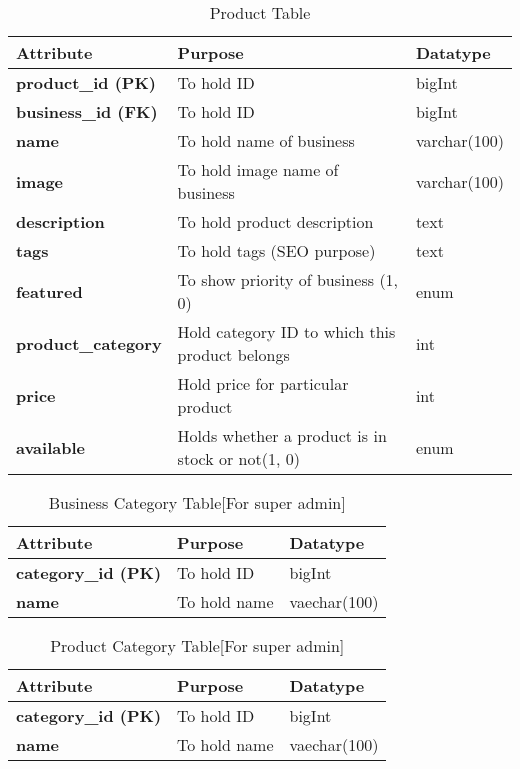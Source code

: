 \documentclass[a4paper]{report}
\begin{document}
\newpage
\begin{table}[ht]
\centering
\caption{Product Table}
\begin{tabular}{lll}    \toprule
Attribute & Purpose & Datatype  \\\midrule
\textbf{product\_id (PK)}    & To hold ID & bigInt  \\
\textbf{business\_id (FK)}    & To hold ID & bigInt  \\  
\textbf{name}    & To hold name of business & varchar(100)  \\
\textbf{image}    & To hold image name of business & varchar(100)  \\
\textbf{description}    & To hold product description & text\\ 
\textbf{tags}    & To hold tags (SEO purpose)  & text \\
\textbf{featured}    & To show priority of business (1, 0)  & enum\\
\textbf{product\_category}    & Hold category ID to which this product belongs & int  \\
\textbf{price}    & Hold price for particular product & int  \\
\textbf{available}    & Holds whether a product is in stock or not(1, 0) & enum  \\
\bottomrule
\end{tabular}
\label{Business Table}
\end{table}

\begin{table}[ht]
\centering
\caption{Business Category Table[For super admin]}
\begin{tabular}{lll}    \toprule
Attribute & Purpose & Datatype  \\\midrule
\textbf{category\_id (PK)}    & To hold ID & bigInt  \\
\textbf{name}    & To hold name & vaechar(100)  \\  
\bottomrule
\end{tabular}
\label{Business Table}
\end{table}

\begin{table}[ht]
\centering
\caption{Product Category Table[For super admin]}
\begin{tabular}{lll}    \toprule
Attribute & Purpose & Datatype  \\\midrule
\textbf{category\_id (PK)}    & To hold ID & bigInt  \\
\textbf{name}    & To hold name & vaechar(100)  \\  
\bottomrule
\end{tabular}
\label{Business Table}
\end{table}



\end{document}
